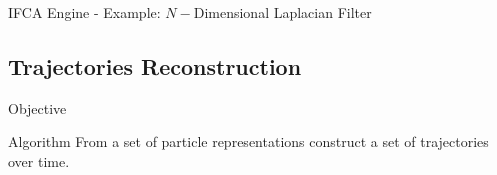 \documentclass{beamer}
\begin{document}
	
		\begin{frame}{IFCA Engine - Example: $N-$Dimensional Laplacian Filter}
			
		\end{frame}	
		
	\subsection{Trajectories Reconstruction}	
		\begin{frame}{Objective}
			\begin{block}{Algorithm}
				From a set of particle representations construct a set of trajectories over time.
			\end{block}
			
			
			
		\end{frame}
\end{document}
